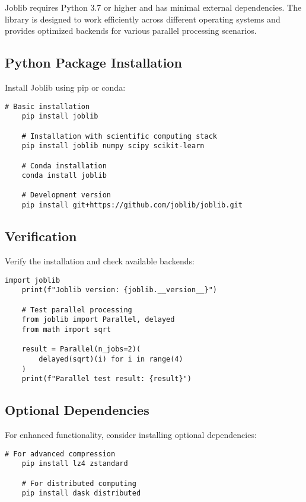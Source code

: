 Joblib requires Python 3.7 or higher and has minimal external dependencies. The library is designed to work efficiently across different operating systems and provides optimized backends for various parallel processing scenarios.

\subsection{Python Package Installation}
\label{subsec:python_install}

Install Joblib using pip or conda:

\begin{lstlisting}[style=bashstyle, caption={Joblib Installation}]
	# Basic installation
	pip install joblib
	
	# Installation with scientific computing stack
	pip install joblib numpy scipy scikit-learn
	
	# Conda installation
	conda install joblib
	
	# Development version
	pip install git+https://github.com/joblib/joblib.git
\end{lstlisting}

\subsection{Verification}
\label{subsec:verification}

Verify the installation and check available backends:

\begin{lstlisting}[language=MyPython, caption={Joblib Verification}]
	import joblib
	print(f"Joblib version: {joblib.__version__}")
	
	# Test parallel processing
	from joblib import Parallel, delayed
	from math import sqrt
	
	result = Parallel(n_jobs=2)(
	    delayed(sqrt)(i) for i in range(4)
	)
	print(f"Parallel test result: {result}")
\end{lstlisting}

\subsection{Optional Dependencies}

For enhanced functionality, consider installing optional dependencies:

\begin{lstlisting}[style=bashstyle, caption={Optional Dependencies}]
	# For advanced compression
	pip install lz4 zstandard
	
	# For distributed computing
	pip install dask distributed
\end{lstlisting}


